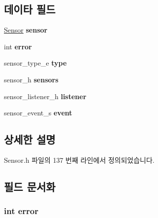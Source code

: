 \subsection*{데이타 필드}
\begin{DoxyCompactItemize}
\item 
\hypertarget{struct___sensor_extend_a788321ec5c87f740898fb2e99ea6da01}{\hyperlink{struct___sensor}{Sensor} {\bfseries sensor}}\label{struct___sensor_extend_a788321ec5c87f740898fb2e99ea6da01}

\item 
\hypertarget{struct___sensor_extend_a11614f44ef4d939bdd984953346a7572}{int {\bfseries error}}\label{struct___sensor_extend_a11614f44ef4d939bdd984953346a7572}

\item 
\hypertarget{struct___sensor_extend_abffb09766da2fc510a79bb51f82a36e1}{sensor\-\_\-type\-\_\-e {\bfseries type}}\label{struct___sensor_extend_abffb09766da2fc510a79bb51f82a36e1}

\item 
\hypertarget{struct___sensor_extend_a5b4eecc7d526422f0b49ff84cac94eb0}{sensor\-\_\-h {\bfseries sensors}}\label{struct___sensor_extend_a5b4eecc7d526422f0b49ff84cac94eb0}

\item 
\hypertarget{struct___sensor_extend_aa977dfb866b24fd7d9a20a9a01b2fd1f}{sensor\-\_\-listener\-\_\-h {\bfseries listener}}\label{struct___sensor_extend_aa977dfb866b24fd7d9a20a9a01b2fd1f}

\item 
\hypertarget{struct___sensor_extend_a40552729aa41c7e02154f5f031c48224}{sensor\-\_\-event\-\_\-s {\bfseries event}}\label{struct___sensor_extend_a40552729aa41c7e02154f5f031c48224}

\end{DoxyCompactItemize}


\subsection{상세한 설명}


Sensor.\-h 파일의 137 번째 라인에서 정의되었습니다.



\subsection{필드 문서화}
\hypertarget{struct___sensor_extend_a11614f44ef4d939bdd984953346a7572}{
\subsubsection[{error}]{\setlength{\rightskip}{0pt plus 5cm}int error}}\label{struct___sensor_extend_a11614f44ef4d939bdd984953346a7572}


